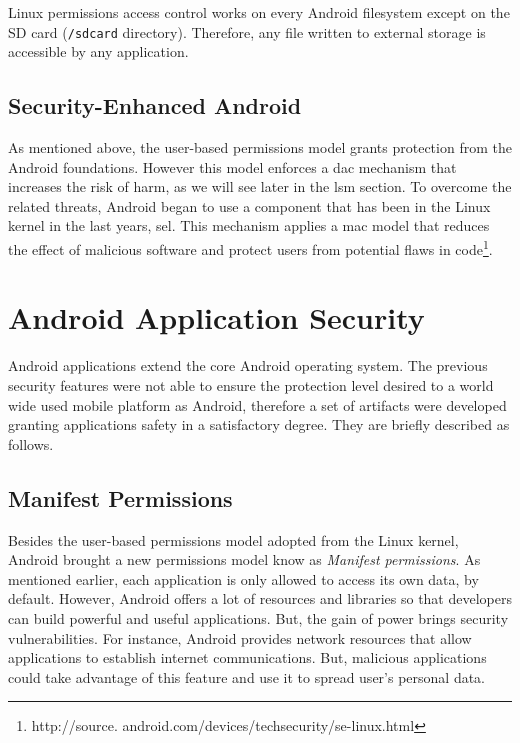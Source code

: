 Linux permissions access control works on every Android filesystem except on the SD card (\texttt{/sdcard} directory). Therefore, any file written to external storage is accessible by any application.

\subsection{Security-Enhanced Android}

As mentioned above, the user-based permissions model grants protection from the Android foundations. However this model enforces a \gls{dac} mechanism that increases the risk of harm, as we will see later in the \gls{lsm} section. To overcome the related threats, Android began to use a component that has been in the Linux kernel in the last years, \gls{sel}. This mechanism applies a \gls{mac} model \cite{SEAndroid} that reduces the effect of malicious software and protect users from potential flaws in code\footnote{http://source. android.com/devices/techsecurity/se-linux.html}. 

\section{Android Application Security}

Android applications extend the core Android operating system. The previous security features were not able to ensure the protection level desired to a world wide used mobile platform as Android, therefore a set of artifacts were developed granting applications safety in a satisfactory degree. They are briefly described as follows.

\subsection{Manifest Permissions}

Besides the user-based permissions model adopted from the Linux kernel, Android brought a new permissions model know as \textit{Manifest permissions}. As mentioned earlier, each application is only allowed to access its own data, by default. However, Android offers a lot of resources and libraries so that developers can build powerful and useful applications. But, the gain of power brings security vulnerabilities. For instance, Android provides network resources that allow applications to establish internet communications. But, malicious applications could take advantage of this feature and use it to spread user's personal data.


